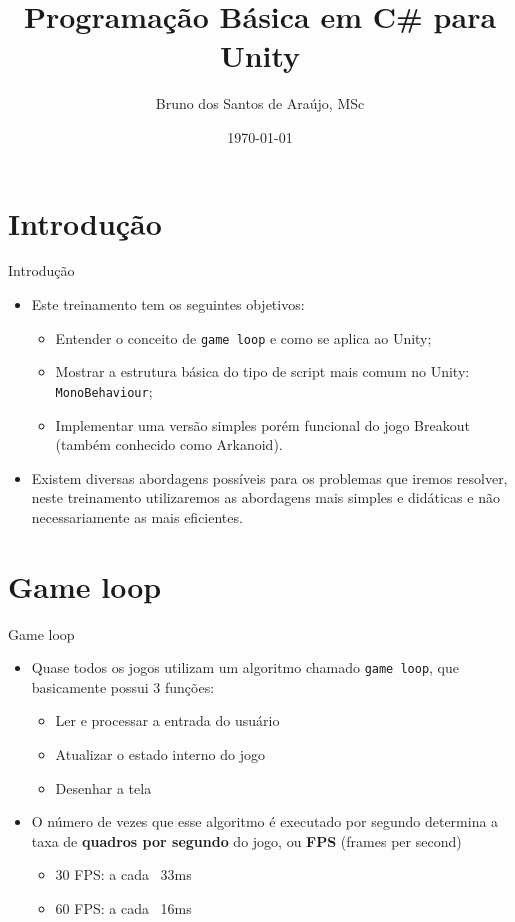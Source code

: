 \documentclass{beamer}
\begin{document}
\title{Programação Básica em C\# para Unity}   
\author{Bruno dos Santos de Araújo, MSc} 
\date{\today} 


\frame{\titlepage} 


\section{Introdução}

\begin{frame}[fragile]{Introdução}
	\begin{itemize}
		\item Este treinamento tem os seguintes objetivos:
		\begin{itemize}
			\item Entender o conceito de \verb|game loop| e como se aplica ao Unity;
			\item Mostrar a estrutura básica do tipo de script mais comum no Unity: \verb|MonoBehaviour|;
			\item Implementar uma versão simples porém funcional do jogo Breakout (também conhecido como Arkanoid).
		\end{itemize}
		\item Existem diversas abordagens possíveis para os problemas que iremos resolver, neste treinamento utilizaremos as abordagens mais simples e didáticas e não necessariamente as mais eficientes.
	\end{itemize}
\end{frame}

\section{Game loop}

\begin{frame}[fragile]{Game loop}
	\begin{itemize}
		\item Quase todos os jogos utilizam um algoritmo chamado \verb|game loop|, que basicamente possui 3 funções:
		\begin{itemize}
			\item Ler e processar a entrada do usuário
			\item Atualizar o estado interno do jogo
			\item Desenhar a tela
		\end{itemize}
		\item O número de vezes que esse algoritmo é executado por segundo determina a taxa de \textbf{quadros por segundo} do jogo, ou \textbf{FPS} (frames per second)
		\begin{itemize}
			\item 30 FPS: a cada ~33ms
			\item 60 FPS: a cada ~16ms
		\end{itemize}
	\end{itemize}
\end{frame}
\end{document}
